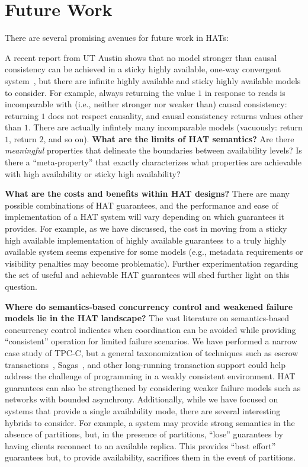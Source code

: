 
\section{Future Work}
\label{sec:futurework}

There are several promising avenues for future work in HATs:

 A recent report from UT Austin shows that no model stronger than
 causal consistency can be achieved in a sticky highly available,
 one-way convergent system~\cite{cac}, but there are infinite highly
 available and sticky highly available models to consider. For
 example, always returning the value $1$ in response to reads is
 incomparable with (i.e., neither stronger nor weaker than) causal
 consistency: returning $1$ does not respect causality, and causal
 consistency returns values other than $1$. There are actually
 infintely many incomparable models (vacuously: return $1$, return
 $2$, and so on). \textbf{What are the limits of HAT semantics?}  Are
 there \textit{meaningful} properties that delineate the boundaries
 between availability levels?  Is there a ``meta-property'' that
 exactly characterizes what properties are achievable with high
 availability or sticky high availability?

\textbf{What are the costs and benefits within HAT designs?} There are
many possible combinations of HAT guarantees, and the performance and
ease of implementation of a HAT system will vary depending on which
guarantees it provides. For example, as we have discussed, the cost in
moving from a sticky high available implementation of highly available
guarantees to a truly highly available system seems expensive for some
models (e.g., metadata requirements or visibility penalties may
become problematic). Further experimentation regarding the set of
useful and achievable HAT guarantees will shed further light on this
question.

\textbf{Where do semantics-based concurrency control and weakened
  failure models lie in the HAT landscape?} The vast literature on
semantics-based concurrency control indicates when coordination can be
avoided while providing ``consistent'' operation for limited failure
scenarios. We have performed a narrow case study of TPC-C, but a
general taxonomization of techniques such as escrow
transactions~\cite{escrow}, Sagas~\cite{sagas}, and other long-running
transaction support could help address the challenge of programming in
a weakly consistent environment. HAT guarantees can also be
strengthened by considering weaker failure models such as networks
with bounded asynchrony. Additionally, while we have focused on
systems that provide a single availability mode, there are several
interesting hybrids to consider. For example, a system may provide
strong semantics in the absence of partitions, but, in the presence of
partitions, ``lose'' guarantees by having clients reconnect to an
available replica. This provides ``best effort'' guarantees but, to
provide availability, sacrifices them in the event of partitions.
